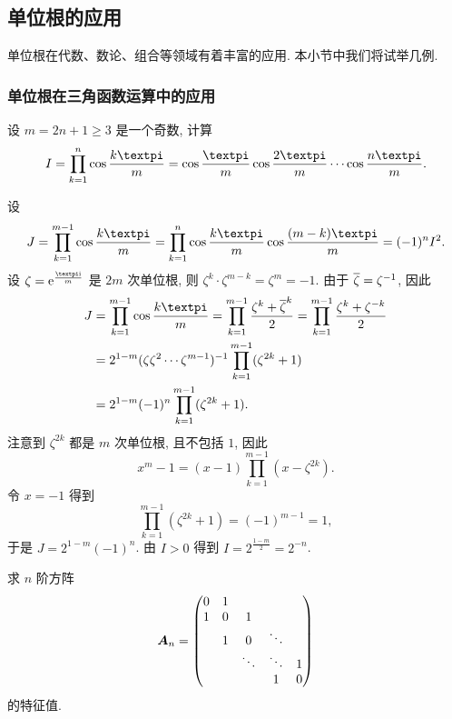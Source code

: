 \subsection{单位根的应用\optional}

单位根在代数、数论、组合等领域有着丰富的应用.
本小节中我们将试举几例.


\subsubsection{单位根在三角函数运算中的应用}

\begin{example}
  设 $m=2n+1\ge 3$ 是一个奇数, 计算
  \[
    I=\prod_{k=1}^n\cos\frac{k\cpi}m
    =\cos\frac{\cpi}m \cos\frac{2\cpi}m \cdots \cos\frac{n\cpi}m.
  \]
\end{example}

\begin{solution}
  设
  \[
     J
    =\prod_{k=1}^{m-1}\cos\frac{k\cpi}m
    =\prod_{k=1}^n\cos\frac{k\cpi}m\cos\frac{(m-k)\cpi}m
    =(-1)^n I^2.
  \]
  设 $\zeta=\ee^{\frac{\cpi\ii}m}$ 是 $2m$ 次单位根, 则 $\zeta^k\cdot\zeta^{m-k}=\zeta^m=-1$.
  由于 $\overline\zeta=\zeta^{-1}$, 因此
  \begin{align*}
     J&
    =\prod_{k=1}^{m-1}\cos\frac{k\cpi}m
    =\prod_{k=1}^{m-1}\frac{\zeta^k+{\ov\zeta}^k}2
    =\prod_{k=1}^{m-1}\frac{\zeta^k+\zeta^{-k}}2\\&
    =2^{1-m}(\zeta\zeta^2\cdots\zeta^{m-1})^{-1}
      \prod_{k=1}^{m-1}(\zeta^{2k}+1)\\&
    =2^{1-m}(-1)^n
      \prod_{k=1}^{m-1}(\zeta^{2k}+1).
  \end{align*}
  注意到 $\zeta^{2k}$ 都是 $m$ 次单位根, 且不包括 $1$, 因此
  \[
    x^m-1=(x-1)\prod_{k=1}^{m-1}(x-\zeta^{2k}).
  \]
  令 $x=-1$ 得到
  \[
    \prod_{k=1}^{m-1}(\zeta^{2k}+1)=(-1)^{m-1}=1,
  \]
  于是 $J=2^{1-m}(-1)^n$.
  由 $I>0$ 得到 $I=2^{\frac{1-m}2}=2^{-n}$.
\end{solution}

\begin{example}
  求 $n$ 阶方阵
  \[
    {\boldsymbol{A}}_n=\begin{pmatrix}
      0&1&&&\\
      1&0&1&&\\
      &1&0&\ddots&\\
      &&\ddots&\ddots &1\\
      &&&1&0
    \end{pmatrix}
  \]
  的特征值.
\end{example}


